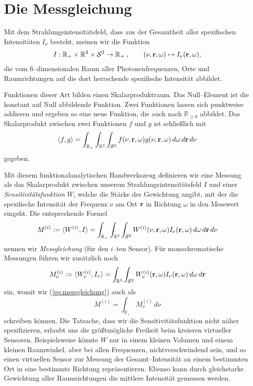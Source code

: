 	
	\section{Die Messgleichung}\label{sec:measurement_equation}
	Mit dem Strahlungsintensitätsfeld, dass aus der Gesamtheit aller spezifischen Intensitäten $I_\nu$ besteht, meinen wir die Funktion
	$$I:\mathbb{R}_+\times\mathbb{R}^3\times\mathcal{S}^2\to\mathbb{R}_+\;,\qquad (\nu,\mathbf{r},\omega)\mapsto I_\nu(\mathbf{r},\omega),$$
	die vom 6--dimensionalen Raum aller Photonenfrequenzen, Orte und Raumrichtungen auf die dort herrschende spezifische Intensität abbildet.
	
	Funktionen dieser Art bilden einen Skalarproduktraum. Das Null--Element ist die konstant auf Null abbildende Funktion. Zwei Funktionen lassen sich punktweise addieren und ergeben so eine neue Funktion, die auch nach $\mathbb{R}_{\geq 0}$ abbildet. Das Skalarprodukt zwischen zwei Funktionen $f$ und $g$ ist schließlich mit
	$$\langle f,g\rangle=\int_{\mathbb{R}_+} \int_{\mathbb{R}^3} \int_{\mathcal{S}^2} f(\nu,\mathbf{r},\omega)g(\nu,\mathbf{r},\omega)\,d\omega\,d\mathbf{r}\,d\nu$$
	gegeben.
	
	Mit diesem funktionalanalytischen Handwerkszeug definieren wir eine Messung als das Skalarprodukt zwischen unserem Strahlungsintensitätsfeld $I$ und einer {\em Sensitivitätsfunktion} $W$, welche die Stärke der Gewichtung angibt, mit der die spezifische Intensität der Frequenz $\nu$ am Ort $\mathbf{r}$ in Richtung $\omega$ in den Messwert eingeht. Die entsprechende Formel
	\begin{equation}\label{eq:messgleichung}
		M^{(i)}:=\langle W^{(i)},I\rangle=\int_{\mathbb{R}_+} \int_{\mathbb{R}^3} \int_{\mathcal{S}^2} W^{(i)}(\nu,\mathbf{r},\omega)I_\nu(\mathbf{r},\omega)\,d\omega\,d\mathbf{r}\,d\nu
	\end{equation}
	nennen wir {\em Messgleichung} (für den $i$--ten Sensor). Für monochromatische Messungen führen wir zusätzlich noch 
	\begin{equation}\label{eq:messgleichung_mono}
		M_\nu^{(i)}:=\langle W_\nu^{(i)},I_\nu\rangle=\int_{\mathbb{R}^3} \int_{\mathcal{S}^2} W_\nu^{(i)}(\mathbf{r},\omega)I_\nu(\mathbf{r},\omega)\,d\omega\,d\mathbf{r}
	\end{equation}
	ein, womit wir (\ref{eq:messgleichung}) auch als
	\begin{equation}\label{eq:messgleichung_frommonos}
		M^{(i)}=\int_{\mathbb{R}_+} M_\nu^{(i)}\,d\nu
	\end{equation}
	schreiben können.
	Die Tatsache, dass wir die Sensitivitätsfunktion nicht näher spezifizieren, erlaubt uns die größtmögliche Freiheit beim kreieren virtueller Sensoren. Beispielsweise könnte $W$ nur in einem kleinen Volumen und einem kleinen Raumwinkel, aber bei allen Frequenzen, nichtverschwindend sein, und so einen virtuellen Sensor zur Messung der Gesamt--Intensität an einem bestimmten Ort in eine bestimmte Richtung repräsentieren. Ebenso kann durch gleichstarke Gewichtung aller Raumrichtungen die mittlere Intensität gemessen werden.
	
